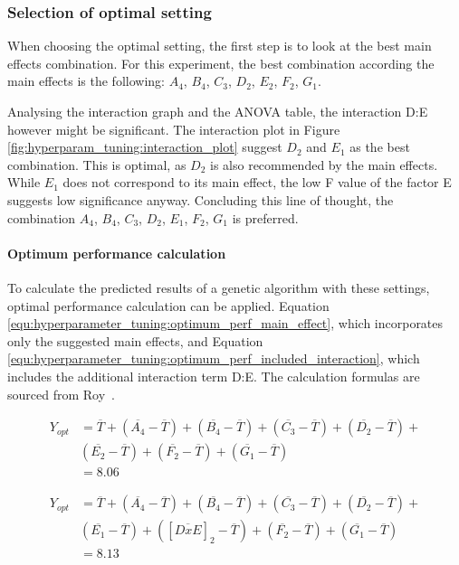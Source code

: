 \subsubsection{Selection of optimal setting}
When choosing the optimal setting, the first step is to look at the best main effects combination. For this experiment, the best combination according the main effects is the following: $A_4$, $B_4$, $C_3$, $D_2$, $E_2$, $F_2$, $G_1$.

Analysing the interaction graph and the ANOVA table, the interaction D:E however might be significant. The interaction plot in Figure \ref{fig:hyperparam_tuning:interaction_plot} suggest $D_2$ and $E_1$ as the best combination. This is optimal, as $D_2$ is also recommended by the main effects. While $E_1$ does not correspond to its main effect, the low F value of the factor E suggests low significance anyway. Concluding this line of thought, the combination $A_4$, $B_4$, $C_3$, $D_2$, $E_1$, $F_2$, $G_1$ is preferred.

\paragraph{Optimum performance calculation}
\label{sect:hyperparameter_tuning:optimum_perf_caluclation}
To calculate the predicted results of a genetic algorithm with these settings, optimal performance calculation can be applied. Equation \ref{equ:hyperparameter_tuning:optimum_perf_main_effect}, which incorporates only the suggested main effects, and Equation \ref{equ:hyperparameter_tuning:optimum_perf_included_interaction}, which includes the additional interaction term D:E. The calculation formulas are sourced from Roy~\cite{roy_primer_1990}.

\begin{equation}
	\begin{split}
		Y_{opt} &= \overline{T} + (\overline{A_4} - \overline{T}) + (\overline{B_4} - \overline{T}) + (\overline{C_3} - \overline{T}) + (\overline{D_2} - \overline{T}) + \\& (\overline{E_2} - \overline{T}) + (\overline{F_2} - \overline{T}) + (\overline{G_1} - \overline{T}) \\
			&= 8.06
	\end{split}
	 \label{equ:hyperparameter_tuning:optimum_perf_main_effect}
\end{equation}


\begin{equation}
	\begin{split}
		Y_{opt} &= \overline{T} + (\overline{A_4} - \overline{T}) + (\overline{B_4} - \overline{T}) + (\overline{C_3} - \overline{T}) + (\overline{D_2} - \overline{T}) + \\& (\overline{E_1} - \overline{T})  + ([\overline{DxE}]_2 - \overline{T})  + (\overline{F_2} - \overline{T}) + (\overline{G_1} - \overline{T}) \\
		&= 8.13
	\end{split}
	 \label{equ:hyperparameter_tuning:optimum_perf_included_interaction}
\end{equation}

